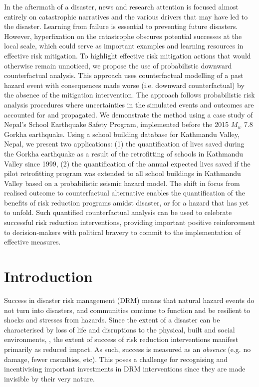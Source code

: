 In the aftermath of a disaster, news and research attention is focused almost entirely on catastrophic narratives and the various drivers that may have led to the disaster. Learning from failure is essential to preventing future disasters. However, hyperfixation on the catastrophe obscures potential successes at the local scale, which could serve as important examples and learning resources in effective risk mitigation. To highlight effective risk mitigation actions that would otherwise remain unnoticed, we propose the use of probabilistic downward counterfactual analysis. This approach uses counterfactual modelling of a past hazard event with consequences made worse (i.e. downward counterfactual) by the absence of the mitigation intervention. The approach follows probabilistic risk analysis procedures where uncertainties in the simulated events and outcomes are accounted for and propagated. We demonstrate the method using a case study of Nepal’s School Earthquake Safety Program, implemented before the 2015 $M_{w}$ 7.8 Gorkha earthquake. Using a school building database for Kathmandu Valley, Nepal, we present two applications: (1) the quantification of lives saved during the Gorkha earthquake as a result of the retrofitting of schools in Kathmandu Valley since 1999, (2) the quantification of the annual expected lives saved if the pilot retrofitting program was extended to all school buildings in Kathmandu Valley based on a probabilistic seismic hazard model. The shift in focus from realised outcome to counterfactual alternative enables the quantification of the benefits of risk reduction programs amidst disaster, or for a hazard that has yet to unfold. Such quantified counterfactual analysis can be used to celebrate successful risk reduction interventions, providing important positive reinforcement to decision-makers with political bravery to commit to the implementation of effective measures.


\section{Introduction}
\label{section-intro}

Success in disaster risk management (DRM) means that natural hazard events do not turn into disasters, and communities continue to function and be resilient to shocks and stresses from hazards. Since the extent of a disaster can be characterised by loss of life and disruptions to the physical, built and social environments, \citep{mileti1999disasters, smith2005through, moore1958tornadoes}, the extent of success of risk reduction interventions manifest primarily as reduced impact. As such, success is measured as an \textit{absence} (e.g. no damage, fewer casualties, etc). This poses a challenge for recognising and incentivising important investments in DRM interventions since they are made invisible by their very nature.

